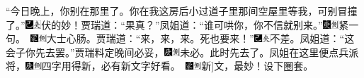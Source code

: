 ``今日晚上，你别在那里了。你在我这房后小过道子里那间空屋里等我，可别冒撞了。''{\includegraphics[width=3mm]{../Images/00003}\includegraphics[width=3mm]{../Images/00012}\footnotesize \kaishu 伏的妙！}贾瑞道：``果真？''凤姐道：``谁可哄你，你不信就别来。''{{\includegraphics[width=3mm]{../Images/00004}\includegraphics[width=3mm]{../Images/00011}\footnotesize \kaishu 紧一句。　}\includegraphics[width=3mm]{../Images/00006}\includegraphics[width=3mm]{../Images/00011}\footnotesize \kaishu 大士心肠。}贾瑞道：``来，来，来。死也要来！''{\includegraphics[width=3mm]{../Images/00003}\includegraphics[width=3mm]{../Images/00012}\footnotesize \kaishu 不差。}凤姐道：``这会子你先去罢。''贾瑞料定晚间必妥，{\includegraphics[width=3mm]{../Images/00004}\includegraphics[width=3mm]{../Images/00011}\footnotesize \kaishu 未必。}此时先去了。凤姐在这里便点兵派将，{{\includegraphics[width=3mm]{../Images/00004}\includegraphics[width=3mm]{../Images/00011}\footnotesize \kaishu 四字用得新，必有新文字好看。　}\includegraphics[width=3mm]{../Images/00006}\includegraphics[width=3mm]{../Images/00011}\footnotesize \kaishu {(剩)}{[}新{]}文，最妙！}设下圈套。

